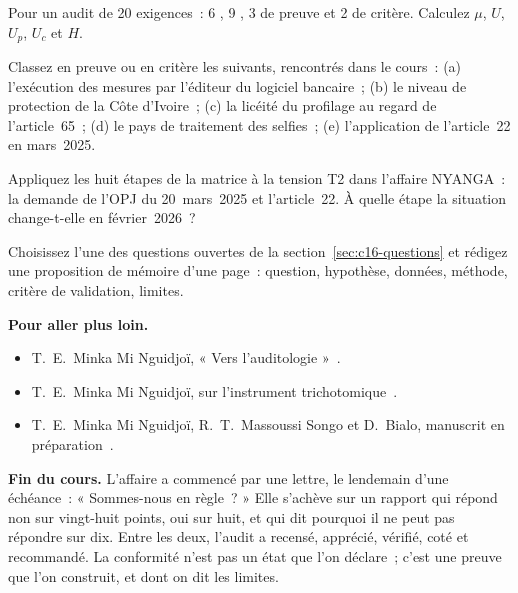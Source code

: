 \begin{boxexo}[title={\ding{45}\quad Exercice~16.1. Calculer \niveaubase}]
Pour un audit de 20 exigences~: 6 \OUI{}, 9 \NON{}, 3 \NEK{} de preuve et
2 \NEK{} de critère. Calculez $\mu$, $U$, $U_p$, $U_c$ et $H$.
\end{boxexo}

\begin{boxexo}[title={\ding{45}\quad Exercice~16.2. Classer les NEK \niveaumoyen}]
Classez en preuve ou en critère les \NEK{} suivants, rencontrés dans le
cours~: (a) l'exécution des mesures par l'éditeur du logiciel bancaire~;
(b) le niveau de protection de la Côte d'Ivoire~; (c) la licéité du
profilage au regard de l'article~65~; (d) le pays de traitement des
selfies~; (e) l'application de l'article~22 en mars~2025.
\end{boxexo}

\begin{boxexo}[title={\ding{45}\quad Exercice~16.3. La matrice \niveaumoyen}]
Appliquez les huit étapes de la matrice à la tension T2 dans l'affaire
NYANGA~: la demande de l'OPJ du 20~mars~2025 et l'article~22. À quelle
étape la situation change-t-elle en février~2026~?
\end{boxexo}

\begin{boxexo}[title={\ding{45}\quad Exercice~16.4. Un sujet de mémoire \niveauexpert}]
Choisissez l'une des questions ouvertes de la section~\ref{sec:c16-questions}
et rédigez une proposition de mémoire d'une page~: question, hypothèse,
données, méthode, critère de validation, limites.
\end{boxexo}

\bigskip

\begin{boxinfo}
\textbf{Pour aller plus loin.}
\begin{itemize}
    \item T.~E.~Minka Mi Nguidjoï, « Vers l'auditologie »~\cite{minka2026auditologie}.
    \item T.~E.~Minka Mi Nguidjoï, sur l'instrument trichotomique~\cite{minka2026nek}.
    \item T.~E.~Minka Mi Nguidjoï, R.~T.~Massoussi Songo et D.~Bialo,
          manuscrit en préparation~\cite{minka2026chainepenale}.
\end{itemize}
\end{boxinfo}

\begin{boxinfo}
\textbf{Fin du cours.} L'affaire a commencé par une lettre, le lendemain
d'une échéance~: « Sommes-nous en règle~? » Elle s'achève sur un rapport
qui répond non sur vingt-huit points, oui sur huit, et qui dit pourquoi il
ne peut pas répondre sur dix. Entre les deux, l'audit a recensé, apprécié,
vérifié, coté et recommandé. La conformité n'est pas un état que l'on
déclare~; c'est une preuve que l'on construit, et dont on dit les limites.
\end{boxinfo}
